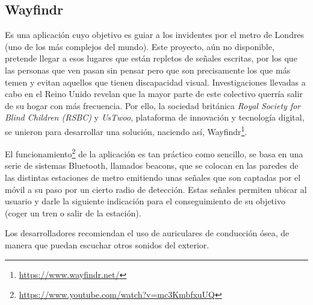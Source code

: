 \documentclass{article}
\begin{document}
    \subsection{Wayfindr} %
        Es una aplicación cuyo objetivo es guiar a los invidentes por el metro de Londres (uno de los más complejos del mundo). Este proyecto, aún no disponible, pretende llegar a esos lugares que están repletos de señales escritas, por los que las personas que ven pasan sin pensar pero que son precisamente los que más temen y evitan aquellos que tienen discapacidad visual. Investigaciones llevadas a cabo en el Reino Unido revelan que la mayor parte de este colectivo querría salir de su hogar con más frecuencia. Por ello, la sociedad británica \textit{Royal Society for Blind Children (RSBC)} y \textit{UsTwoo}, plataforma de innovación y tecnología digital, se unieron para desarrollar una solución, naciendo así, Wayfindr\footnote{\url{https://www.wayfindr.net/}}.
        
        El funcionamiento\footnote{\url{https://www.youtube.com/watch?v=mc3KmbfxuUQ}} de la aplicación es tan práctico como sencillo, se basa en una serie de sistemas Bluetooth, llamados beacons, que se colocan en las paredes de las distintas estaciones de metro emitiendo unas señales que son captadas por el móvil a su paso por un cierto radio de detección. Estas señales permiten ubicar al usuario y darle la siguiente indicación para el conseguimiento de su objetivo (coger un tren o salir de la estación).
        
        Los desarrolladores recomiendan el uso de auriculares de conducción ósea, de manera que puedan escuchar otros sonidos del exterior.
 
	
\end{document}

